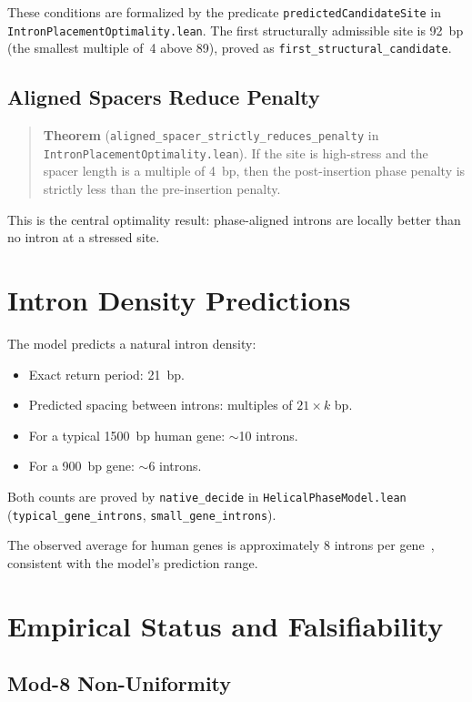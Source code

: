 \documentclass[11pt,twocolumn]{article}
\begin{document}
These conditions are formalized by the predicate
\texttt{predictedCandidateSite} in \texttt{IntronPlacementOptimality.lean}.
The first structurally admissible site is 92~bp (the smallest multiple
of~4 above 89), proved as \texttt{first\_structural\_candidate}.

\subsection{Aligned Spacers Reduce Penalty}

\begin{quote}
\textbf{Theorem}
(\texttt{aligned\_spacer\_strictly\_reduces\_penalty} in
\texttt{IntronPlacementOptimality.lean}). If the site is
high-stress and the spacer length is a multiple of 4~bp, then the
post-insertion phase penalty is strictly less than the pre-insertion
penalty.
\end{quote}

This is the central optimality result: phase-aligned introns are locally
better than no intron at a stressed site.

\section{Intron Density Predictions}

The model predicts a natural intron density:
\begin{itemize}
\item Exact return period: 21~bp.
\item Predicted spacing between introns: multiples of $21 \times k$ bp.
\item For a typical 1500~bp human gene: $\sim$10 introns.
\item For a 900~bp gene: $\sim$6 introns.
\end{itemize}
Both counts are proved by \texttt{native\_decide} in
\texttt{HelicalPhaseModel.lean} (\texttt{typical\_gene\_introns},
\texttt{small\_gene\_introns}).

The observed average for human genes is approximately 8 introns per
gene~\cite{Sakharkar2004}, consistent with the model's prediction range.

\section{Empirical Status and Falsifiability}

\subsection{Mod-8 Non-Uniformity}
\end{document}
